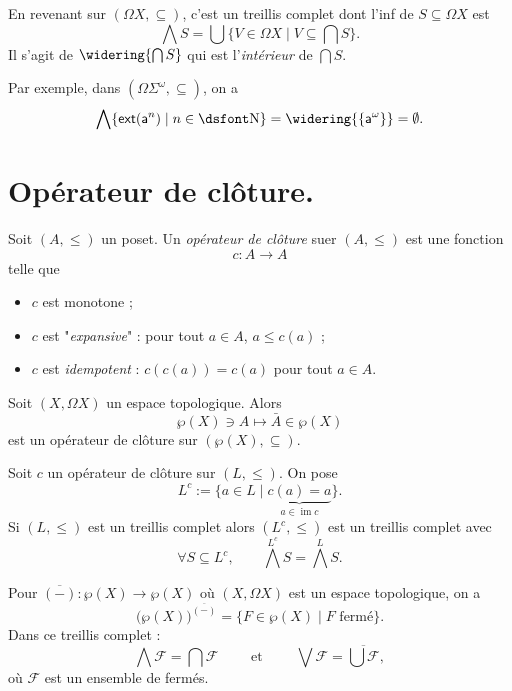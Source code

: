 \documentclass[./main]{subfiles}
\begin{document}
  \begin{exm}
    En revenant sur $(\Omega X, \subseteq)$, c'est un treillis complet dont l'inf de $S \subseteq \Omega X$ est 
    \[
      \bigwedge S = \bigcup \{V \in \Omega X  \mid V \subseteq {\textstyle \bigcap S} \} 
    .\]
    Il s'agit de $\widering {\bigcap S}$ qui est l'\textit{intérieur} de $\bigcap S$.

    Par exemple, dans $(\Omega \Sigma^\omega, \subseteq)$, on a 
    \[
      \bigwedge \{\mathsf{ext}(\mathsf{a}^n)  \mid  n\in \mathds{N}\} = \widering{\{\mathsf{a}^\omega\} } = \emptyset
    .\] 
  \end{exm}

  \section{Opérateur de clôture.}

  \begin{defn}
    Soit $(A, \le)$ un poset.
    Un \textit{opérateur de clôture} suer $(A, \le)$ est une fonction
    \[
    c : A \to A
    \] 
    telle que
    \begin{itemize}
      \item $c$ est monotone ;
      \item $c$ est "\textit{expansive}" : pour tout $a \in A$, $a \le c(a)$ ;
      \item $c$ est \textit{idempotent} : $c(c(a)) = c(a)$ pour tout $a \in A$.
    \end{itemize}
  \end{defn}

  \begin{exm}
    Soit $(X, \Omega X)$ un espace topologique.
    Alors
    \[
    \wp(X) \ni A \mapsto \bar{A} \in \wp(X)
    \]
    est un opérateur de clôture sur $(\wp(X), \subseteq)$.
  \end{exm}

  \begin{lem}
    Soit $c$ un opérateur de clôture sur $(L, \le)$.
    On pose \[
      L^c := \{a \in L  \mid \underbrace{c(a) = a}_{a \in \operatorname{im} c}\} 
    .\]
    Si $(L, \le )$ est un treillis complet alors $(L^c, \le)$ est un treillis complet avec \[
    \forall S \subseteq L^c, \quad\quad \bigwedge^{L^c} S = \bigwedge^L S
    .\] 
  \end{lem}

  \begin{exm}
    Pour $\overline{(-)} : \wp(X) \to \wp(X)$ où $(X, \Omega X)$ est un espace topologique, on a
    \[
      \big(\wp(X)\big)^{\overline{(-)}} = \{F \in \wp(X)  \mid F \text{ fermé}\}
    .\]
    Dans ce treillis complet :
    \[
      \bigwedge \mathcal{F} = \bigcap \mathcal{F} \quad\quad \text{ et } \quad\quad \bigvee \mathcal{F} = \overline{\bigcup \mathcal{F}} 
    ,\] 
    où $\mathcal{F}$ est un ensemble de fermés.
  \end{exm}
\end{document}
